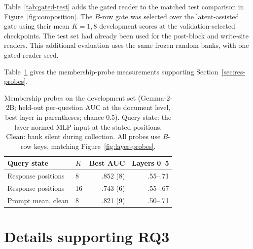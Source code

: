 Table~\ref{tab:gated-test} adds the gated reader to the matched test comparison
in Figure~\ref{fig:composition}. The $B$-row gate was selected over the
latent-assisted gate using their mean $K=1,8$ development scores at the
validation-selected checkpoints. The test set had already
been used for the post-block and write-site readers. This additional evaluation
uses the same frozen random banks, with one gated-reader seed.

Table~\ref{tab:probes} gives the membership-probe measurements supporting
Section~\ref{sec:res-probes}.

\begin{table}[t]
\centering
\caption{Membership probes on the development set (Gemma-2-2B; held-out per-question
AUC at the document level, best layer in parentheses; chance 0.5). Query
state: the layer-normed MLP input at the stated positions. Clean: bank silent during
collection. All probes use $B$-row keys, matching Figure~\ref{fig:layer-probes}.}
\label{tab:probes}
\small\setlength{\tabcolsep}{4pt}
\begin{tabular}{@{}llrr@{}}
\toprule
Query state & $K$ & Best AUC & Layers 0--5 \\
\midrule
Response positions & 8 & .852 (8) & .55--.71 \\
Response positions & 16 & .743 (6) & .55--.67 \\
Prompt mean, clean & 8 & .821 (9) & .50--.71 \\
\bottomrule
\end{tabular}
\end{table}



\section{Details supporting RQ3}

